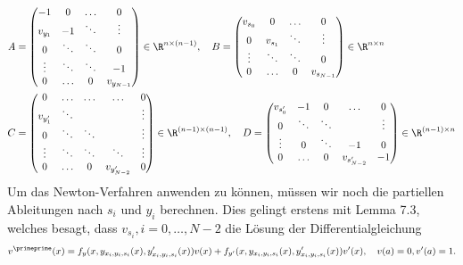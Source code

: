 \begin{solution}
\begin{align*}
    A &= \begin{pmatrix}
    -1 & 0 & \hdots & 0\\
      v_{y_1} & -1 & \ddots & \vdots\\
      0 & \ddots & \ddots & 0\\
      \vdots & \ddots & \ddots & -1\\
      0 & \hdots & 0 & v_{y_{N-1}}\\
  \end{pmatrix} \in \R^{n \times (n-1)}, \quad
  B = \begin{pmatrix}
  v_{s_0} & 0 & \hdots & 0 \\
   0 & v_{s_1} & \ddots & \vdots\\
   \vdots & \ddots & \ddots & 0 \\
   0 & \hdots & 0 & v_{s_{N-1}}\\
\end{pmatrix} \in \R^{n \times n} \\
C &= \begin{pmatrix}
 0 &\hdots & \hdots & \hdots & 0\\
 v_{y^{\prime}_1} & \ddots & & & \vdots\\
 0 & \ddots &  \ddots& & \vdots \\
 \vdots & \ddots & \ddots &  \ddots & \vdots\\
 0 & \hdots & 0 & v_{y^{\prime}_{N-2}} & 0 \\
\end{pmatrix} \in \R^{(n-1)\times(n-1)}, \quad
D = \begin{pmatrix}
  v_{s^{\prime}_0} & -1 & 0 & \hdots & 0\\
  0 & \ddots & \ddots  & & \vdots \\
  \vdots & 0 & \ddots & -1 & 0\\
  0 & \hdots & 0 & v_{s^{\prime}_{N-2}} & -1\\
\end{pmatrix} \in \R^{(n-1)\times n}
  \end{align*}
Um das Newton-Verfahren anwenden zu können, müssen wir noch die partiellen
Ableitungen nach $s_i$ und $y_i$ berechnen. Dies gelingt erstens mit Lemma 7.3, welches
besagt, dass $v_{s_i}, i = 0,\dots,N-2$ die Lösung der Differentialgleichung
\begin{align*}
  v^{\primeprime}(x) = f_y(x,y_{x_i,y_i,s_i}(x),y_{x_i,y_i,s_i}^{\prime}(x))v(x)
  + f_{y^{\prime}}(x,y_{x_i,y_i,s_i}(x),y_{x_i,y_i,s_i}^{\prime}(x))v^{\prime}(x), \quad v(a) = 0, v^{\prime}(a) = 1.
\end{align*}

\end{solution}
